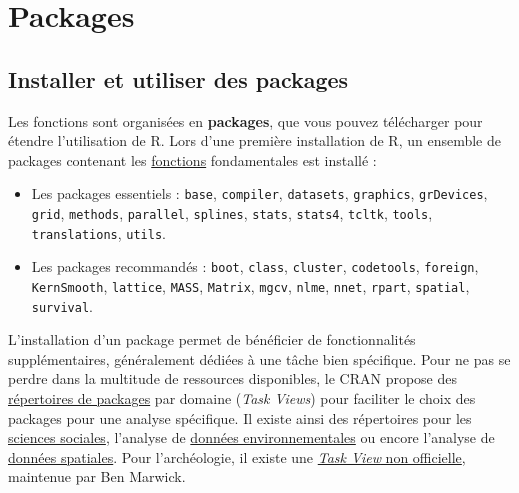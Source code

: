 \documentclass[
  french,
]{scrbook}
\providecommand{\tightlist}{%
  \setlength{\itemsep}{0pt}\setlength{\parskip}{0pt}}
\begin{document}
\hypertarget{packages}{%
\section{Packages}\label{packages}}

\hypertarget{installer-et-utiliser-des-packages}{%
\subsection{Installer et utiliser des packages}\label{installer-et-utiliser-des-packages}}

Les fonctions sont organisées en \textbf{packages}, que vous pouvez télécharger pour étendre l'utilisation de R. Lors d'une première installation de R, un ensemble de packages contenant les \protect\hyperlink{fonctions}{fonctions} fondamentales est installé :

\begin{itemize}
\tightlist
\item
  Les packages essentiels : \texttt{base}, \texttt{compiler}, \texttt{datasets}, \texttt{graphics}, \texttt{grDevices}, \texttt{grid}, \texttt{methods}, \texttt{parallel}, \texttt{splines}, \texttt{stats}, \texttt{stats4}, \texttt{tcltk}, \texttt{tools}, \texttt{translations}, \texttt{utils}.
\item
  Les packages recommandés : \texttt{boot}, \texttt{class}, \texttt{cluster}, \texttt{codetools}, \texttt{foreign}, \texttt{KernSmooth}, \texttt{lattice}, \texttt{MASS}, \texttt{Matrix}, \texttt{mgcv}, \texttt{nlme}, \texttt{nnet}, \texttt{rpart}, \texttt{spatial}, \texttt{survival}.
\end{itemize}

L'installation d'un package permet de bénéficier de fonctionnalités supplémentaires, généralement dédiées à une tâche bien spécifique. Pour ne pas se perdre dans la multitude de ressources disponibles, le CRAN propose des \href{https://cran.r-project.org/web/views/}{répertoires de packages} par domaine (\emph{Task Views}) pour faciliter le choix des packages pour une analyse spécifique. Il existe ainsi des répertoires pour les \href{https://cran.r-project.org/web/views/SocialSciences.html}{sciences sociales}, l'analyse de \href{https://cran.r-project.org/web/views/Environmetrics.html}{données environnementales} ou encore l'analyse de \href{https://cran.r-project.org/web/views/Spatial.html}{données spatiales}. Pour l'archéologie, il existe une \href{https://github.com/benmarwick/ctv-archaeology}{\emph{Task View} non officielle}, maintenue par Ben Marwick.
\end{document}
